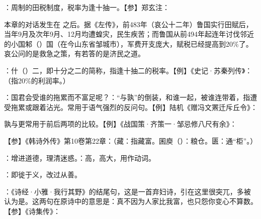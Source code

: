 {
\item {}：周制的田税制度，税率为逢十抽一。【参】郑玄注：

本章的对话发生在  之后。据《左传》，前483年（哀公十二年）鲁国实行田赋后，当年9月及次年9月、12月均遭蝗灾，民生疾苦；而鲁国从前494年起连年讨伐邻近的小国邾（）国（在今山东省邹城市），军费开支庞大，赋税已经提高到20\%了。哀公问的是救急之策，有若答的是济民之道。

\item {}：什（）二，即十分之二的简称，指逢十抽二的税率。【例】《史记·苏秦列传》：（指20\%的利润率。）
\item {}：国君会受谁的拖累而不富足呢？：“与孰”的倒装，和谁一起，被谁连带着，指遭受拖累或跟着沾光。常用于语气强烈的反问句。【例】陆机《赠冯文罴迁斥丘令》：

孰与更常用于前后两项的比较。【例】《战国策·齐策一·邹忌修八尺有余》：

【参】《韩诗外传》第10卷第22章：（藏：指藏富。囷庾（）：粮仓。匮：通“柜”。）
}
{}


{
\item {}：增进道德，理清迷惑。：高，高大，用作动词。
\item {}：即徙于义，改过从善。
\item {}：《诗经·小雅·我行其野》的结尾句，这是一首弃妇诗，引在这里很突兀，多被认为是。这两句在原诗中的意思是：真不因为人家比我富，也只怨你变心不算数。【参】《诗集传》：
}
{}


